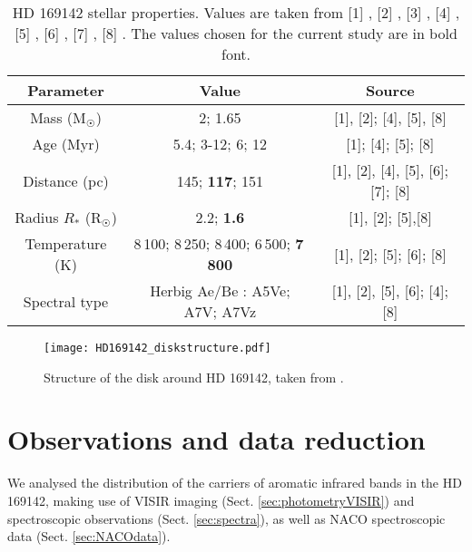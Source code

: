 \documentclass{aa}
\begin{document}
\begin{table*}[!ht]
        \centering
        \begin{tabular}{ccc}
                \hline
                Parameter&Value&Source\\
                \hline  
                Mass ($\text{M}_{\astrosun}$)& 2; 1.65&[1], [2]; [4], [5], [8]\\
                Age (Myr)&5.4; 3-12; 6; 12&[1]; [4]; [5]; [8] \\
                Distance (pc)&145; \textbf{117}; 151&[1], [2], [4], [5], [6]; [7]; [8]\\
                Radius $R_*$ ($\text{R}_{\astrosun}$)&2.2; \textbf{1.6}&[1], [2]; [5],[8]\\
                Temperature (K)&8\,100; 8\,250; 8\,400; 6\,500; \textbf{7\,800}&[1], [2]; [5]; [6]; [8]\\
                Spectral type&Herbig Ae/Be : A5Ve; A7V; A7Vz&[1], [2], [5], [6]; [4]; [8] \\
                \hline
        \end{tabular}
        \caption{HD 169142 stellar properties. Values are taken from [1] \cite{Manoj_2006}, [2] \cite{Monnier_2017}, [3] \cite{Quanz_2013}, [4] \cite{Biller_2014}, [5] \cite{Seok_2016}, [6] \cite{Dunkin_1997}, [7] \cite{Ligi2018}, [8] \cite{Blondel_2006}. The values chosen for the current study are in bold font.}
        \label{tab:HD 169142_star}
\end{table*}

\begin{figure}[!ht]
    \centering
    \texttt{[image: HD169142\_diskstructure.pdf]}
    \caption{Structure of the disk around HD 169142, taken from \citet{Osorio_2014, Monnier_2017, Ligi2018}.}
    \label{fig:diskstructure}
\end{figure}


\section{Observations and data reduction} \label{sec:observations}
We analysed the distribution of the carriers of aromatic infrared bands in the HD 169142, making use of VISIR imaging (Sect. \ref{sec:photometryVISIR}) and spectroscopic observations (Sect. \ref{sec:spectra}), as well as NACO spectroscopic data (Sect. \ref{sec:NACOdata}).
\end{document}
